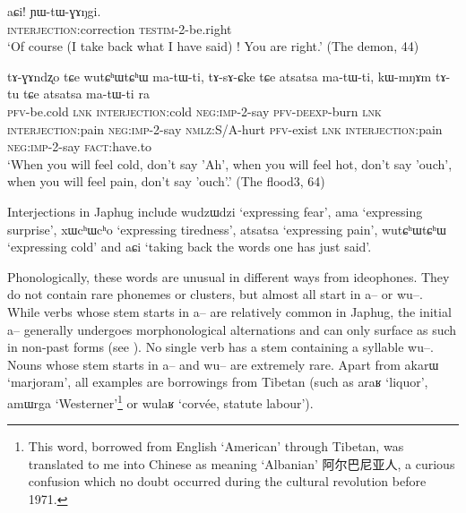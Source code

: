 \documentclass[oldfontcommands,oneside,a4paper,11pt]{article}
\newcommand{\ipa}[1]{{\phon \mbox{#1}}} %
\newcommand{\zh}[1]{{\cn #1}}
\begin{document}
       \begin{exe}
\ex \label{ex:aCi}
\gll 
\ipa{aɕi!} 	\ipa{ɲɯ-tɯ-ɣɤŋgi.} \\
\textsc{interjection}:correction \textsc{testim}-2-be.right \\
\glt `Of course (I take back what I have said) ! You are right.' (The demon, 44)
\end{exe}
      \begin{exe}
\ex \label{ex:atsatsa}
\gll 
 	\ipa{tɤ-ɣɤndʐo} 	\ipa{tɕe} 	\ipa{wutɕʰɯtɕʰɯ} 	\ipa{ma-tɯ-ti,} 	\ipa{tɤ-sɤ-ɕke} 	\ipa{tɕe} 	 	\ipa{atsatsa} 	\ipa{ma-tɯ-ti,}  \ipa{kɯ-mŋɤm} 	\ipa{tɤ-tu} 	\ipa{tɕe} 	\ipa{atsatsa} 	\ipa{ma-tɯ-ti} 	\ipa{ra} \\
 	\textsc{pfv}-be.cold \textsc{lnk} \textsc{interjection}:cold \textsc{neg:imp}-2-say \textsc{pfv-deexp}-burn \textsc{lnk} \textsc{interjection}:pain \textsc{neg:imp}-2-say \textsc{nmlz}:S/A-hurt \textsc{pfv}-exist \textsc{lnk} \textsc{interjection}:pain \textsc{neg:imp}-2-say \textsc{fact}:have.to  	\\
\glt `When you will feel cold, don't say 'Ah', when you will feel hot, don't say 'ouch', when you will feel pain, don't say 'ouch'.' (The flood3, 64)
\end{exe}
  
 Interjections in Japhug include  \ipa{wudzɯdzi} `expressing fear',  \ipa{ama} `expressing surprise', \ipa{xɯcʰɯcʰo} `expressing tiredness', \ipa{atsatsa} `expressing pain', \ipa{wutɕʰɯtɕʰɯ} `expressing cold' and \ipa{aɕi} `taking back the words one has just said'.
 
 Phonologically, these words are unusual in different ways from ideophones. They do not contain rare phonemes or clusters, but almost all start in \ipa{a--} or \ipa{wu--}. While verbs whose stem starts  in \ipa{a--} are relatively common in Japhug, the initial \ipa{a--} generally undergoes   morphonological alternations and can only surface as such in non-past forms (see \citealt{jacques07passif}).  No   single verb has a stem containing  a syllable \ipa{wu--}. Nouns whose stem starts in \ipa{a--} and \ipa{wu--}   are extremely rare. Apart from \ipa{akarɯ} `marjoram', all examples are borrowings from Tibetan (such as \ipa{araʁ} `liquor', \ipa{amɯrga} `Westerner'\footnote{This word, borrowed from English `American' through Tibetan, was translated to me into Chinese as meaning `Albanian' \zh{阿尔巴尼亚人},  a curious confusion which no doubt occurred during the cultural revolution before 1971.} or \ipa{wulaʁ} `corvée, statute labour').
\end{document}
